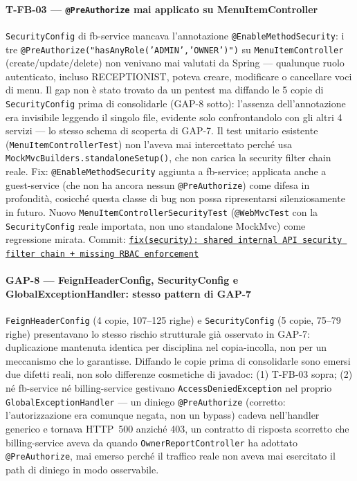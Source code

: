 ﻿\documentclass[a4paper,12pt]{report}
\newcommand{\commitref}[2]{\texttt{\small \href{https://github.com/diegoandruccioli/hotel-pms/commit/#1}{#2}}}
\begin{document}
\paragraph{T-FB-03 --- \texttt{@PreAuthorize} mai applicato su MenuItemController}
\texttt{SecurityConfig} di fb-service mancava l'annotazione
\texttt{@EnableMethodSecurity}: i tre \texttt{@PreAuthorize("hasAnyRole('ADMIN','OWNER')")}
su \texttt{MenuItemController} (create/update/delete) non venivano mai valutati
da Spring --- qualunque ruolo autenticato, incluso RECEPTIONIST, poteva creare,
modificare o cancellare voci di menu. Il gap non è stato trovato da un pentest
ma diffando le 5 copie di \texttt{SecurityConfig} prima di consolidarle
(GAP-8 sotto): l'assenza dell'annotazione era invisibile leggendo il singolo
file, evidente solo confrontandolo con gli altri 4 servizi --- lo stesso schema
di scoperta di GAP-7. Il test unitario esistente
(\texttt{MenuItemControllerTest}) non l'aveva mai intercettato perché usa
\texttt{MockMvcBuilders.standaloneSetup()}, che non carica la security filter
chain reale.
Fix: \texttt{@EnableMethodSecurity} aggiunta a fb-service; applicata anche a
guest-service (che non ha ancora nessun \texttt{@PreAuthorize}) come difesa in
profondità, cosicché questa classe di bug non possa ripresentarsi
silenziosamente in futuro. Nuovo \texttt{MenuItemControllerSecurityTest}
(\texttt{@WebMvcTest} con la \texttt{SecurityConfig} reale importata, non uno
standalone MockMvc) come regressione mirata.
Commit: \commitref{bdce1e5}{fix(security): shared internal API security filter chain + missing RBAC enforcement}

\paragraph{GAP-8 --- FeignHeaderConfig, SecurityConfig e GlobalExceptionHandler: stesso pattern di GAP-7}
\texttt{FeignHeaderConfig} (4 copie, 107--125 righe) e \texttt{SecurityConfig}
(5 copie, 75--79 righe) presentavano lo stesso rischio strutturale già
osservato in GAP-7: duplicazione mantenuta identica per disciplina nel
copia-incolla, non per un meccanismo che lo garantisse. Diffando le copie
prima di consolidarle sono emersi due difetti reali, non solo differenze
cosmetiche di javadoc: (1) T-FB-03 sopra; (2) né fb-service né billing-service
gestivano \texttt{AccessDeniedException} nel proprio \texttt{GlobalExceptionHandler}
--- un diniego \texttt{@PreAuthorize} (corretto: l'autorizzazione era comunque
negata, non un bypass) cadeva nell'handler generico e tornava HTTP~500 anziché
403, un contratto di risposta scorretto che billing-service aveva da quando
\texttt{OwnerReportController} ha adottato \texttt{@PreAuthorize}, mai emerso
perché il traffico reale non aveva mai esercitato il path di diniego in modo
osservabile.
\end{document}
